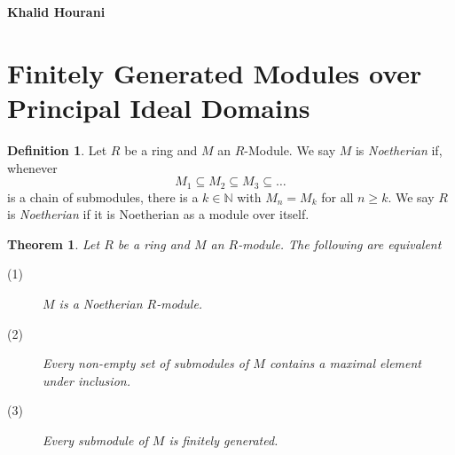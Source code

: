 \documentclass[12pt,leqno]{article}
\numberwithin{equation}{section}
\newtheorem{thm}{Theorem}[section]
\theoremstyle{definition}
\newtheorem*{Def}{Definition}
\begin{document}
\thispagestyle{plain}
\begin{flushright}
\large{\textbf{Khalid Hourani\\
}}
\end{flushright}
\section{Finitely Generated Modules over Principal Ideal Domains}
\begin{Def}
 Let $R$ be a ring and $M$ an $R$-Module. We say $M$ is \textit{Noetherian} if, whenever \[M_1\subseteq M_2\subseteq M_3\subseteq\hdots\] is a chain of submodules, there is a $k\in\mathbb{N}$ with $M_n=M_k$ for all $n\geq k$. We say $R$ is \textit{Noetherian} if it is Noetherian as a module over itself.
\end{Def}

\begin{thm}
 Let $R$ be a ring and $M$ an $R$-module. The following are equivalent
\begin{description}
 \item [(1)] $M$ is a Noetherian $R$-module.
 \item [(2)] Every non-empty set of submodules of $M$ contains a maximal element under inclusion.
 \item [(3)] Every submodule of $M$ is finitely generated.
\end{description}
\end{thm}
\end{document}
